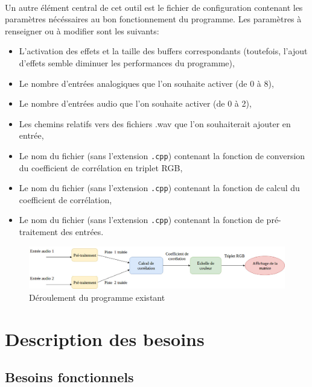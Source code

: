 \documentclass{article}
\begin{document}
\paragraph{}
Un autre élément central de cet outil est le fichier de configuration
contenant les paramètres nécéssaires au bon fonctionnement du programme. Les
paramètres à renseigner ou à modifier sont les suivants:
\begin{itemize}
 \item L'activation des effets et la taille des buffers correspondants
       (toutefois, l'ajout d'effets semble diminuer les performances du
       programme),
 \item Le nombre d'entrées analogiques que l'on souhaite activer (de 0 à 8),
 \item Le nombre d'entrées audio que l'on souhaite activer (de 0 à 2),
 \item Les chemins relatifs vers des fichiers .wav que l'on souhaiterait
       ajouter en entrée,
 \item Le nom du fichier (sans l'extension \verb!.cpp!) contenant la
       fonction de conversion du coefficient de corrélation en triplet RGB,
 \item Le nom du fichier (sans l'extension \verb!.cpp!) contenant la
       fonction de calcul du coefficient de corrélation,
 \item Le nom du fichier (sans l'extension \verb!.cpp!) contenant la
       fonction de pré-traitement des entrées.
\end{itemize}
\begin{figure}[h]
 \caption{\label{bela_process}Déroulement du programme existant}
 \centering
 \includegraphics[scale=0.40]{bela_process.jpg}
\end{figure}
\newpage
\section{Description des besoins}
\subsection{Besoins fonctionnels}
\end{document}
